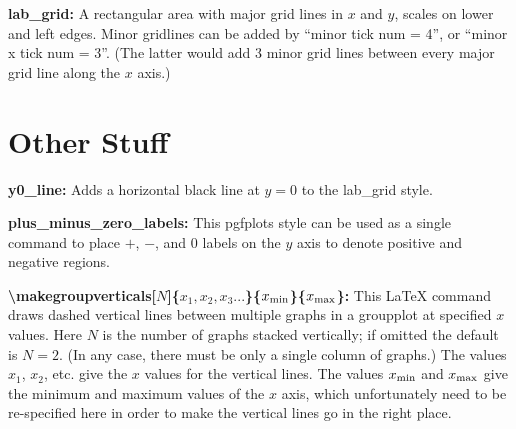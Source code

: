 \documentclass{article}
\begin{document}
\textbf{lab\_grid:} A rectangular area with major grid lines in $x$ and $y$, scales on lower and left edges.  Minor gridlines can be added by ``minor tick num = 4'', or ``minor x tick num = 3''.  (The latter would add 3 minor grid lines between every major grid line along the $x$ axis.)

\section{Other Stuff}

\textbf{y0\_line:} Adds a horizontal black line at $y=0$ to the lab\_grid style.

\textbf{plus\_minus\_zero\_labels:} This pgfplots style can be used as a single command to place $+$, $-$, and $0$ labels on the $y$ axis to denote positive and negative regions.

\textbf{\textbackslash makegroupverticals[$N$]\{$x_1, x_2, x_3...$\}\{$x_{\rm min}$\}\{$x_{\rm max}$\}:} This LaTeX command draws dashed vertical lines between multiple graphs in a groupplot at specified $x$ values.  Here $N$ is the number of graphs stacked vertically; if omitted the default is $N=2$. (In any case, there must be only a single column of graphs.)  The values $x_1$, $x_2$, etc. give the $x$ values for the vertical lines.  The values $x_{\rm min}$ and $x_{\rm max}$ give the minimum and maximum values of the $x$ axis, which unfortunately need to be re-specified here in order to make the vertical lines go in the right place.
\end{document}
